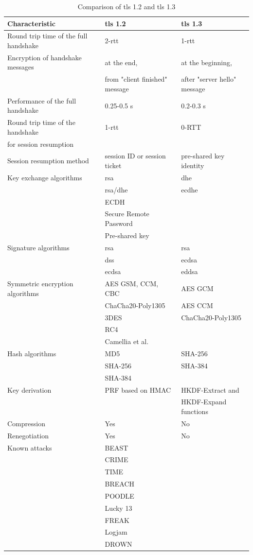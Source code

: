 \begin{table}[H]
	\centering
		\begin{tabular}{lll} \toprule
			\textbf{Characteristic} & \textbf{\gls{tls} 1.2} & \textbf{\gls{tls} 1.3} \\ \midrule
			Round trip time of the full handshake & 2-\gls{rtt} & 1-\gls{rtt} \\ \midrule
			Encryption of handshake messages & at the end, & at the beginning, \\ 
			& from "client finished" message & after "server hello" message \\ \midrule
			Performance of the full handshake & 0.25-0.5 s & 0.2-0.3 s\\ \midrule
			Round trip time of the handshake & 1-\gls{rtt} & 0-RTT \\ 
			for session resumption \\ \midrule
			Session resumption method & session ID or session ticket & pre-shared key identity \\ \midrule
			Key exchange algorithms & \gls{rsa} & \gls{dhe}\\ 
			& \gls{rsa}/\gls{dhe} & \gls{ecdhe}\\
			& ECDH \\
			& Secure Remote Password \\
			& Pre-shared key \\ \midrule
			Signature algorithms & \gls{rsa} & \gls{rsa}\\
			& \gls{dss} & \gls{ecdsa}\\
			& \gls{ecdsa} & \gls{eddsa} \\ \midrule
			Symmetric encryption algorithms & AES GSM, CCM, CBC  & AES GCM\\
			& ChaCha20-Poly1305 & AES CCM \\
			& 3DES & ChaCha20-Poly1305 \\
			& RC4 \\
			& Camellia et al.\\ \midrule
			Hash algorithms & MD5 & SHA-256 \\
			& SHA-256 & SHA-384 \\
			& SHA-384 \\ \midrule
			Key derivation & PRF based on HMAC & HKDF-Extract and \\
			& & HKDF-Expand functions \\ \midrule
			Compression & Yes & No \\ \midrule
			Renegotiation & Yes & No \\ \midrule
			Known attacks &  BEAST \\ & CRIME \\ & TIME\\ & BREACH\\ & POODLE\\ & Lucky 13\\ & FREAK\\ & Logjam\\ & DROWN \\ \midrule
		
		\end{tabular}
	\caption{Comparison of \gls{tls} 1.2 and \gls{tls} 1.3}
	\label{tab:comparison}
\end{table}

